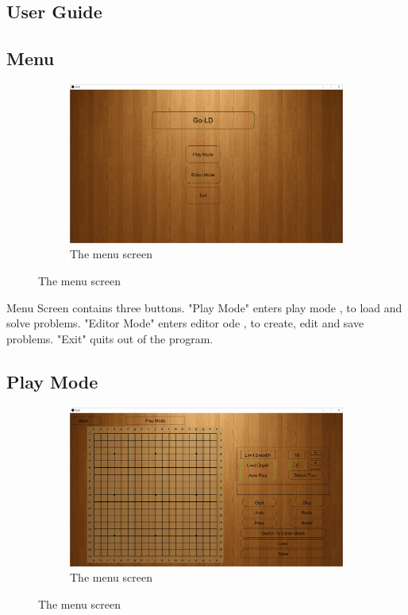 \documentclass{l4proj}
\begin{document}
\begin{appendices}
\chapter{User Guide}

\section{Menu}

\begin{figure}[H]
\centering
\begin{subfigure}[b]{\textwidth}
\centering
\includegraphics[width=\textwidth]{A3/1.png}
\caption{The menu screen}
\end{subfigure}
\end{figure}

Menu Screen contains three buttons. "Play Mode" enters play mode , to load and solve problems. "Editor Mode" enters editor ode , to create, edit and save problems. "Exit" quits out of the program.


\section{Play Mode}

\begin{figure}[H]
\centering
\begin{subfigure}[b]{\textwidth}
\centering
\includegraphics[width=\textwidth]{A3/2.png}
\caption{The menu screen}
\end{subfigure}
\end{figure}


\end{appendices}
\end{document}
